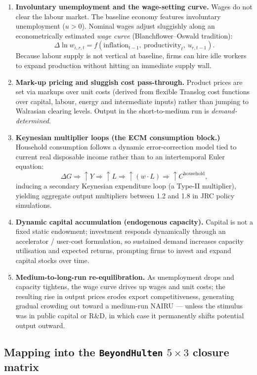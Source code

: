 \begin{enumerate}
\item \textbf{Involuntary unemployment and the wage-setting curve.} Wages do
  not clear the labour market. The baseline economy features involuntary
  unemployment ($u > 0$). Nominal wages adjust sluggishly along an
  econometrically estimated \emph{wage curve} (Blanchflower--Oswald
  tradition):
  \[
  \Delta \ln w_{i,r,t} = f(\text{inflation}_{t-1},\ \text{productivity}_{t},\ u_{r,t-1}).
  \]
  Because labour supply is not vertical at baseline, firms can hire idle
  workers to expand production without hitting an immediate supply wall.
\item \textbf{Mark-up pricing and sluggish cost pass-through.} Product prices
  are set via markups over unit costs (derived from flexible Translog cost
  functions over capital, labour, energy and intermediate inputs) rather than
  jumping to Walrasian clearing levels. Output in the short-to-medium run is
  \emph{demand-determined}.
\item \textbf{Keynesian multiplier loops (the ECM consumption block.)}
  Household consumption follows a dynamic error-correction model tied to
  current real disposable income rather than to an intertemporal Euler
  equation:
  \[
  \Delta G \Rightarrow \uparrow Y \Rightarrow \uparrow L
  \Rightarrow \uparrow (w\cdot L) \Rightarrow \uparrow C^{\text{household}},
  \]
  inducing a secondary Keynesian expenditure loop (a Type-II multiplier),
  yielding aggregate output multipliers between 1.2 and 1.8 in JRC policy
  simulations.
\item \textbf{Dynamic capital accumulation (endogenous capacity).} Capital is
  not a fixed static endowment; investment responds dynamically through an
  accelerator / user-cost formulation, so sustained demand increases capacity
  utilisation and expected returns, prompting firms to invest and expand
  capital stocks over time.
\item \textbf{Medium-to-long-run re-equilibration.} As unemployment drops and
  capacity tightens, the wage curve drives up wages and unit costs; the
  resulting rise in output prices erodes export competitiveness, generating
  gradual crowding out toward a medium-run NAIRU --- unless the stimulus was
  in public capital or R\&D, in which case it permanently shifts potential
  output outward.
\end{enumerate}

\subsection{Mapping into the \texttt{BeyondHulten} $5\times3$ closure matrix}\label{app:matrix-map}

